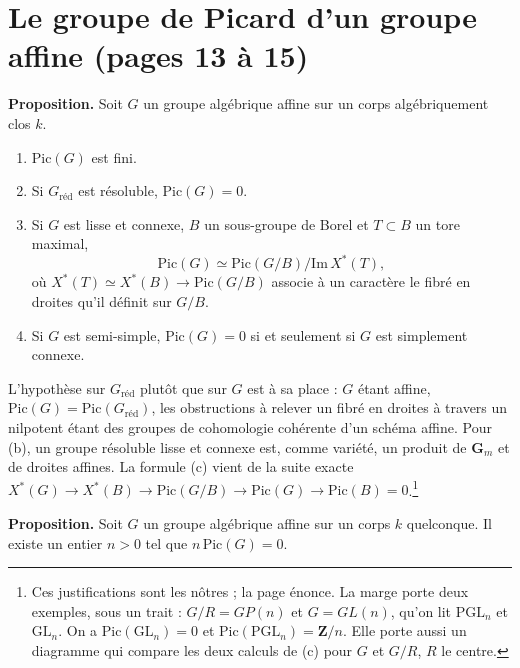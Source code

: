 \documentclass[11pt,a4paper]{article}
\begin{document}
\section*{Le groupe de Picard d'un groupe affine (pages 13 à 15)}

\textbf{Proposition.} Soit $G$ un groupe algébrique affine sur un corps
algébriquement clos $k$.
\begin{enumerate}
\item[(a)] $\mathrm{Pic}(G)$ est fini.
\item[(b)] Si $G_{\mathrm{réd}}$ est résoluble, $\mathrm{Pic}(G) = 0$.
\item[(c)] Si $G$ est lisse et connexe, $B$ un sous-groupe de Borel et
$T \subset B$ un tore maximal,
\[
  \mathrm{Pic}(G) \simeq \mathrm{Pic}(G/B) / \mathrm{Im}\, X^{*}(T) ,
\]
où $X^{*}(T) \simeq X^{*}(B) \to \mathrm{Pic}(G/B)$ associe à un caractère le
fibré en droites qu'il définit sur $G/B$.
\item[(d)] Si $G$ est semi-simple, $\mathrm{Pic}(G) = 0$ si et seulement si
$G$ est simplement connexe.
\end{enumerate}

L'hypothèse sur $G_{\mathrm{réd}}$ plutôt que sur $G$ est à sa place : $G$
étant affine, $\mathrm{Pic}(G) = \mathrm{Pic}(G_{\mathrm{réd}})$, les
obstructions à relever un fibré en droites à travers un nilpotent étant des
groupes de cohomologie cohérente d'un schéma affine. Pour (b), un groupe
résoluble lisse et connexe est, comme variété, un produit de
$\mathbf{G}_{m}$ et de droites affines. La formule (c) vient de la suite exacte
$X^{*}(G) \to X^{*}(B) \to \mathrm{Pic}(G/B) \to \mathrm{Pic}(G) \to
\mathrm{Pic}(B) = 0$.\footnote{Ces justifications sont les nôtres ; la page
énonce. La marge porte deux exemples, sous un trait : $G/R = GP(n)$ et
$G = GL(n)$, qu'on lit $\mathrm{PGL}_{n}$ et $\mathrm{GL}_{n}$. On a
$\mathrm{Pic}(\mathrm{GL}_{n}) = 0$ et $\mathrm{Pic}(\mathrm{PGL}_{n}) =
\mathbf{Z}/n$. Elle porte aussi un diagramme qui compare les deux calculs de
(c) pour $G$ et $G/R$, $R$ le centre.}

\textbf{Proposition.} Soit $G$ un groupe algébrique affine sur un corps $k$
quelconque. Il existe un entier $n > 0$ tel que $n\, \mathrm{Pic}(G) = 0$.
\end{document}
